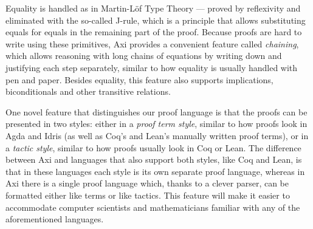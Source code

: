 Equality is handled as in Martin-Löf Type Theory --- proved by reflexivity and eliminated with the so-called J-rule, which is a principle that allows substituting equals for equals in the remaining part of the proof. Because proofs are hard to write using these primitives, Axi provides a convenient feature called \textit{chaining}, which allows reasoning with long chains of equations by writing down and justifying each step separately, similar to how equality is usually handled with pen and paper. Besides equality, this feature also supports implications, biconditionals and other transitive relations.

One novel feature that distinguishes our proof language is that the proofs can be presented in two styles: either in a \textit{proof term style}, similar to how proofs look in Agda and Idris (as well as Coq's and Lean's manually written proof terms), or in a \textit{tactic style}, similar to how proofs usually look in Coq or Lean. The difference between Axi and languages that also support both styles, like Coq and Lean, is that in these languages each style is its own separate proof language, whereas in Axi there is a single proof language which, thanks to a clever parser, can be formatted either like terms or like tactics. This feature will make it easier to accommodate computer scientists and mathematicians familiar with any of the aforementioned languages.
